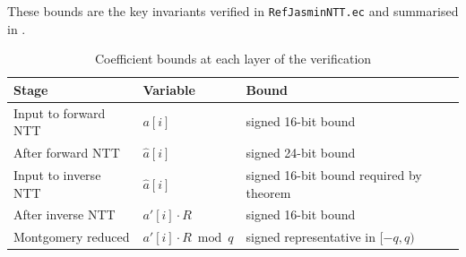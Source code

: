 These bounds are the key invariants verified in \texttt{RefJasminNTT.ec}
and summarised in .

\begin{table}[htbp]
\centering
\caption{Coefficient bounds at each layer of the verification}
\label{tab:bounds}
\small
\begin{tabular}{
  >{\raggedright\arraybackslash}p{}
  >{\raggedright\arraybackslash}p{}
  >{\raggedright\arraybackslash}p{}}
\toprule
Stage & Variable & Bound \\
\midrule
Input to forward NTT & $a[i]$ & signed 16-bit bound \\
After forward NTT & $\hat{a}[i]$ & signed 24-bit bound \\
Input to inverse NTT & $\hat{a}[i]$ & signed 16-bit bound required by theorem \\
After inverse NTT & $a'[i]\cdot R$ & signed 16-bit bound \\
Montgomery reduced & $a'[i] \cdot R \bmod q$ & signed representative in $[-q,q)$ \\
\bottomrule
\end{tabular}
\normalsize
\end{table}
